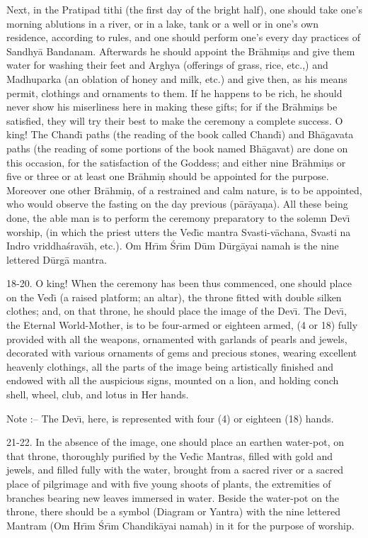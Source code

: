 Next, in the Pratipad tithi (the first day of the bright half), one should take one's morning ablutions in a river, or in a lake, tank or a well or in one's own residence, according to rules, and one should perform one's every day practices of Sandhy\=a Bandanam. Afterwards he should appoint the Br\=ahmi\d{n}s and give them water for washing their feet and Arghya (offerings of grass, rice, etc.,) and Madhuparka (an oblation of honey and milk, etc.) and give then, as his means permit, clothings and ornaments to them. If he happens to be rich, he should never show his miserliness here in making these gifts; for if the Br\=ahmi\d{n}s be satisfied, they will try their best to make the ceremony a complete success. O king! The Chand\={\i} paths (the reading of the book called Chand\={\i}) and Bh\=agavata paths (the reading of some portions of the book named Bh\=agavat) are done on this occasion, for the satisfaction of the Goddess; and either nine Br\=ahmi\d{n}s or five or three or at least one Br\=ahmi\d{n} should be appointed for the purpose. Moreover one other Br\=ahmi\d{n}, of a restrained and calm nature, is to be appointed, who would observe the fasting on the day previous (p\=ar\=aya\d{n}a). All these being done, the able man is to perform the ceremony preparatory to the solemn Dev\={\i} worship, (in which the priest utters the Ved\={\i}c mantra Svasti-v\=achana, Svasti na Indro vriddha\'srav\=ah, etc.). Om Hr\={\i}m \'Sr\={\i}m D\=um D\=urg\=ayai namah is the nine lettered D\=urg\=a mantra.

18-20. O king! When the ceremony has been thus commenced, one should place on the Ved\={\i} (a raised platform; an altar), the throne fitted with double silken clothes; and, on that throne, he should place the image of the Dev\={\i}. The Dev\={\i}, the Eternal World-Mother, is to be four-armed or eighteen armed, (4 or 18) fully provided with all the weapons, ornamented with garlands of pearls and jewels, decorated with various ornaments of gems and precious stones, wearing excellent heavenly clothings, all the parts of the image being artistically finished and endowed with all the auspicious signs, mounted on a lion, and holding conch shell, wheel, club, and lotus in Her hands.

Note :-- The Dev\={\i}, here, is represented with four (4) or eighteen (18) hands.

21-22. In the absence of the image, one should place an earthen water-pot, on that throne, thoroughly purified by the Ved\={\i}c Mantras, filled with gold and jewels, and filled fully with the water, brought from a sacred river or a sacred place of pilgrimage and with five young shoots of plants, the extremities of branches bearing new leaves immersed in water. Beside the water-pot on the throne, there should be a symbol (Diagram or Yantra) with the nine lettered Mantram (Om Hr\={\i}m \'Sr\={\i}m Chandik\=ayai namah) in it for the purpose of worship.

